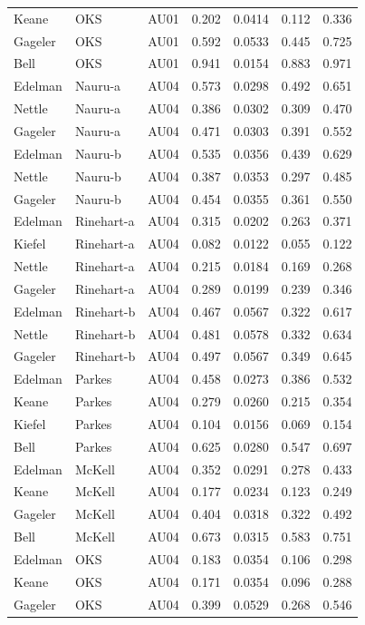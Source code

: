 \documentclass{monashthesis}
\begin{document}
\begin{center}
\begin{longtable}{lllllll}
Keane & OKS & AU01 & 0.202 & 0.0414 & 0.112 & 0.336 \\
Gageler & OKS & AU01 & 0.592 & 0.0533 & 0.445 & 0.725 \\
Bell & OKS & AU01 & 0.941 & 0.0154 & 0.883 & 0.971 \\
Edelman & Nauru-a & AU04 & 0.573 & 0.0298 & 0.492 & 0.651 \\
Nettle & Nauru-a & AU04 & 0.386 & 0.0302 & 0.309 & 0.470 \\
Gageler & Nauru-a & AU04 & 0.471 & 0.0303 & 0.391 & 0.552 \\
Edelman & Nauru-b & AU04 & 0.535 & 0.0356 & 0.439 & 0.629 \\
Nettle & Nauru-b & AU04 & 0.387 & 0.0353 & 0.297 & 0.485 \\
Gageler & Nauru-b & AU04 & 0.454 & 0.0355 & 0.361 & 0.550 \\
Edelman & Rinehart-a & AU04 & 0.315 & 0.0202 & 0.263 & 0.371 \\
Kiefel & Rinehart-a & AU04 & 0.082 & 0.0122 & 0.055 & 0.122 \\
Nettle & Rinehart-a & AU04 & 0.215 & 0.0184 & 0.169 & 0.268 \\
Gageler & Rinehart-a & AU04 & 0.289 & 0.0199 & 0.239 & 0.346 \\
Edelman & Rinehart-b & AU04 & 0.467 & 0.0567 & 0.322 & 0.617 \\
Nettle & Rinehart-b & AU04 & 0.481 & 0.0578 & 0.332 & 0.634 \\
Gageler & Rinehart-b & AU04 & 0.497 & 0.0567 & 0.349 & 0.645 \\
Edelman & Parkes & AU04 & 0.458 & 0.0273 & 0.386 & 0.532 \\
Keane & Parkes & AU04 & 0.279 & 0.0260 & 0.215 & 0.354 \\
Kiefel & Parkes & AU04 & 0.104 & 0.0156 & 0.069 & 0.154 \\
Bell & Parkes & AU04 & 0.625 & 0.0280 & 0.547 & 0.697 \\
Edelman & McKell & AU04 & 0.352 & 0.0291 & 0.278 & 0.433 \\
Keane & McKell & AU04 & 0.177 & 0.0234 & 0.123 & 0.249 \\
Gageler & McKell & AU04 & 0.404 & 0.0318 & 0.322 & 0.492 \\
Bell & McKell & AU04 & 0.673 & 0.0315 & 0.583 & 0.751 \\
Edelman & OKS & AU04 & 0.183 & 0.0354 & 0.106 & 0.298 \\
Keane & OKS & AU04 & 0.171 & 0.0354 & 0.096 & 0.288 \\
Gageler & OKS & AU04 & 0.399 & 0.0529 & 0.268 & 0.546 \\

\end{longtable}
\end{center}
\end{document}
